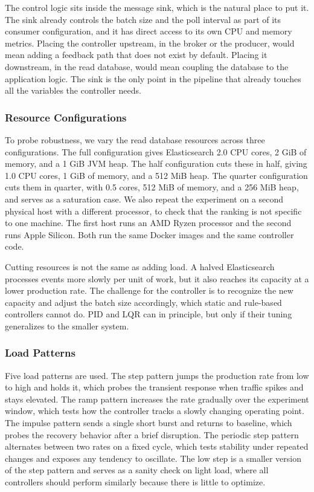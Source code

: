 \documentclass[10pt,a4paper]{article}
\begin{document}
The control logic sits inside the message sink, which is the natural place to put it. The sink already controls the batch size and the poll interval as part of its consumer configuration, and it has direct access to its own CPU and memory metrics. Placing the controller upstream, in the broker or the producer, would mean adding a feedback path that does not exist by default. Placing it downstream, in the read database, would mean coupling the database to the application logic. The sink is the only point in the pipeline that already touches all the variables the controller needs.

\subsubsection{Resource Configurations}

To probe robustness, we vary the read database resources across three configurations. The full configuration gives Elasticsearch 2.0 CPU cores, 2 GiB of memory, and a 1 GiB JVM heap. The half configuration cuts these in half, giving 1.0 CPU cores, 1 GiB of memory, and a 512 MiB heap. The quarter configuration cuts them in quarter, with 0.5 cores, 512 MiB of memory, and a 256 MiB heap, and serves as a saturation case. We also repeat the experiment on a second physical host with a different processor, to check that the ranking is not specific to one machine. The first host runs an AMD Ryzen processor and the second runs Apple Silicon. Both run the same Docker images and the same controller code.

Cutting resources is not the same as adding load. A halved Elasticsearch processes events more slowly per unit of work, but it also reaches its capacity at a lower production rate. The challenge for the controller is to recognize the new capacity and adjust the batch size accordingly, which static and rule-based controllers cannot do. PID and LQR can in principle, but only if their tuning generalizes to the smaller system.

\subsubsection{Load Patterns}

Five load patterns are used. The step pattern jumps the production rate from low to high and holds it, which probes the transient response when traffic spikes and stays elevated. The ramp pattern increases the rate gradually over the experiment window, which tests how the controller tracks a slowly changing operating point. The impulse pattern sends a single short burst and returns to baseline, which probes the recovery behavior after a brief disruption. The periodic step pattern alternates between two rates on a fixed cycle, which tests stability under repeated changes and exposes any tendency to oscillate. The low step is a smaller version of the step pattern and serves as a sanity check on light load, where all controllers should perform similarly because there is little to optimize.
\end{document}
